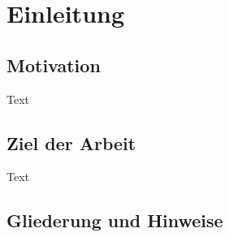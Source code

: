 \chapter{Einleitung}
\label{ch:einleitung}

\section{Motivation}
\label{sec:motivation}

Text

\section{Ziel der Arbeit}
\label{sec:ziel}
Text

\section{Gliederung und Hinweise}
\label{sec:gliederung}

\blindtext[2]

\blindtext[3]